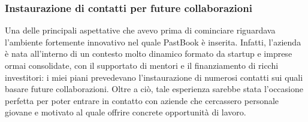 			\subsubsection{Instaurazione di contatti per future collaborazioni}
				Una delle principali aspettative che avevo prima di cominciare riguardava l'ambiente fortemente innovativo nel quale
				PastBook è inserita. Infatti, l'azienda è nata all'interno di un contesto molto dinamico formato da startup e imprese
				ormai consolidate, con il supportato di mentori e il finanziamento di ricchi investitori: i miei piani prevedevano
				l'instaurazione di numerosi contatti sui quali basare future collaborazioni. Oltre a ciò, tale esperienza sarebbe
				stata l'occasione perfetta per poter entrare in contatto con aziende che cercassero personale giovane e motivato al
				quale offrire concrete opportunità di lavoro.
